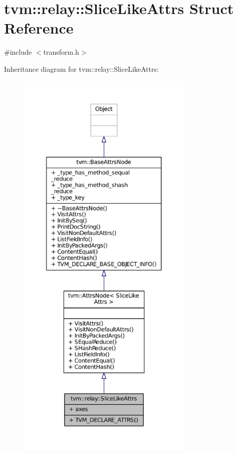 \hypertarget{structtvm_1_1relay_1_1SliceLikeAttrs}{}\section{tvm\+:\+:relay\+:\+:Slice\+Like\+Attrs Struct Reference}
\label{structtvm_1_1relay_1_1SliceLikeAttrs}


{\ttfamily \#include $<$transform.\+h$>$}



Inheritance diagram for tvm\+:\+:relay\+:\+:Slice\+Like\+Attrs\+:
\nopagebreak
\begin{figure}[H]
\begin{center}
\leavevmode
\includegraphics[height=550pt]{structtvm_1_1relay_1_1SliceLikeAttrs__inherit__graph}
\end{center}
\end{figure}


